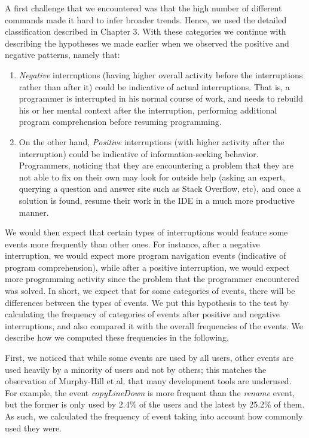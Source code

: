 A first challenge that we encountered was that the high number of different commands made it hard to infer broader trends. Hence, we used the detailed classification described in Chapter 3. With these categories we continue with describing the hypotheses we made earlier when we observed the positive and negative patterns, namely that:

\begin{enumerate}
	\item \emph{Negative} interruptions (having higher overall activity before the interruptions rather than after it) could be indicative of actual interruptions. That is, a programmer is interrupted in his normal course of work, and needs to rebuild his or her mental context after the interruption, performing additional program comprehension before resuming programming.
	\item On the other hand, \emph{Positive} interruptions (with higher activity after the interruption) could be indicative of information-seeking behavior. Programmers, noticing that they are encountering a problem that they are not able to fix on their own may look for outside help (asking an expert, querying a question and answer site such as Stack Overflow, etc), and once a solution is found, resume their work in the IDE in a much more productive manner.
	\end{enumerate}

We would then expect that certain types of interruptions would feature some events more frequently than other ones. For instance, after a negative interruption, we would expect more program navigation events (indicative of program comprehension), while after a positive interruption, we would expect more programming activity since the problem that the programmer encountered was solved. In short, we expect that for some categories of events, there will be differences between the types of events. We put this hypothesis to the test by calculating the frequency of categories of events after positive and negative interruptions, and also compared it with the overall frequencies of the events. We describe how we computed these frequencies in the following.

First, we noticed that while some events are used by all users, other events are used heavily by a minority of users and not by others; this matches the observation of Murphy-Hill et al. \cite{MPB12} that many development tools are underused. For example, the event \textit{copyLineDown} is more frequent than the \textit{rename} event, but the former is only used by 2.4\% of the users and the latest by 25.2\% of them. As such, we calculated the frequency of event taking into account how commonly used they were.

